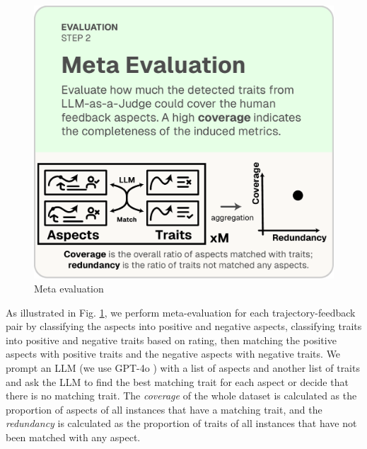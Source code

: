 \begin{figure}
  \vspace{-10pt}
  \includegraphics[width=\linewidth]{figs/autolibra_step_4.pdf}
  \vspace{-10pt}
  \caption{Meta evaluation}
  \label{fig:meta_evaluation}
\end{figure}
As illustrated in Fig. \ref{fig:meta_evaluation}, we perform meta-evaluation for each trajectory-feedback pair by classifying the aspects into positive and negative aspects, classifying
traits into positive and negative traits based on rating, then matching the positive aspects with positive traits
and the negative aspects with negative traits. 
We prompt an LLM (we use GPT-4o \citep{openai2024gpt4ocard}) with a list of aspects and another list of traits
and ask the LLM to find the best matching trait for each aspect or decide that there is no matching trait.
The \emph{coverage} of the whole dataset is calculated as the proportion of aspects of all instances that have a matching trait,
and the \emph{redundancy} is calculated as the proportion of traits of all instances that have not been matched with any aspect.


